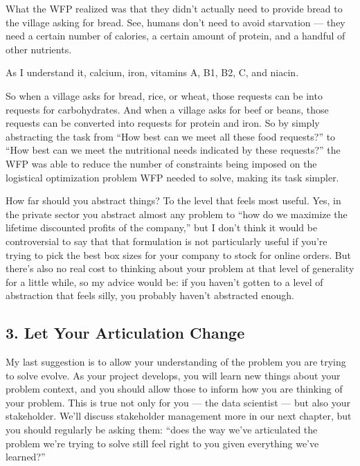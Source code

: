 \documentclass[letterpaper,10pt,english]{jupyterBook}
\begin{document}
\sphinxAtStartPar
What the WFP realized was that they didn’t actually need to provide bread to the village asking for bread. See, humans don’t need  to avoid starvation — they need a certain number of calories, a certain amount of protein, and a handful of other nutrients.%
\begin{footnote}[3]\sphinxAtStartFootnote
As I understand it, calcium, iron, vitamins A, B1, B2, C, and niacin.
%
\end{footnote} So when a village asks for bread, rice, or wheat, those requests can be  into requests for carbohydrates. And when a village asks for beef or beans, those requests can be converted into requests for protein and iron. So by simply abstracting the task from “How best can we meet all these food requests?” to “How best can we meet the nutritional needs indicated by these requests?” the WFP was able to  reduce the number of constraints being imposed on the logistical optimization problem WFP needed to solve, making its task  simpler.

\sphinxAtStartPar
How far should you abstract things? To the level that feels most useful. Yes, in the private sector you  abstract almost any problem to “how do we maximize the lifetime discounted profits of the company,” but I don’t think it would be controversial to say that that formulation is not particularly useful if you’re trying to pick the best box sizes for your company to stock for online orders. But there’s also no real cost to thinking about your problem at that level of generality for a little while, so my advice would be: if you haven’t gotten to a level of abstraction that feels silly, you probably haven’t abstracted enough.


\subsection{3. Let Your Articulation Change}
\label{\detokenize{20_problems_to_questions/10_solving_the_right_problem:let-your-articulation-change}}
\sphinxAtStartPar
My last suggestion is to allow your understanding of the problem you are trying to solve evolve. As your project develops, you will learn new things about your problem context, and you should allow those to inform how you are thinking of your problem. This is true not only for you — the data scientist — but also your stakeholder. We’ll discuss stakeholder management more in our next chapter, but you should regularly be asking them: “does the way we’ve articulated the problem we’re trying to solve still feel right to you given everything we’ve learned?”
\end{document}
